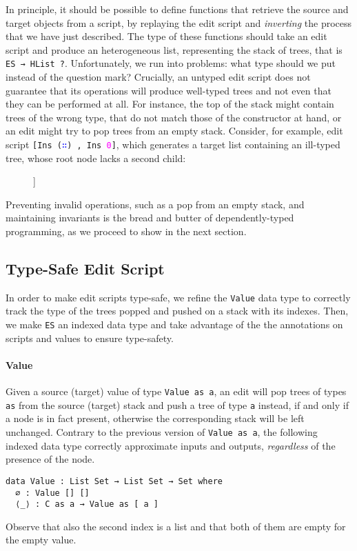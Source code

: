 \documentclass{sigplanconf}
\theoremstyle{plain}
\newcommand{\cons}{\texttt{(\textcolor{blue}{∷})}}
\newcommand{\num}[1]{\textcolor{magenta}{\texttt{#1}}}
\begin{document}
%
In principle, it should be possible to define functions that retrieve
the source and target objects from a script, by replaying the edit
script and \emph{inverting} the process that we have just described.
%
The type of these functions should take an edit script and produce an
heterogeneous list, representing the stack of trees, that is \texttt{ES →
  HList ?}.
%
Unfortunately, we run into problems: what type should we put instead of
the question mark?
%
Crucially, an untyped edit script does not guarantee that its
operations will produce well-typed trees and not even that they can be
performed at all.
%
For instance, the top of the stack might contain trees of the wrong
type, that do not match those of the constructor at hand, or an edit
might try to pop trees from an empty stack.
%
Consider, for example, edit script \texttt{[Ins \cons
  , Ins \num{0}]}, which generates a target list
containing an ill-typed tree, whose root node lacks a second child:
\begin{figure}[!h]
\centering
\Tree
[.{\cons}
   [.{\num{0}} ]
]
\end{figure}

%
Preventing invalid operations, such as a pop from an empty stack, and
maintaining invariants is the bread and butter of dependently-typed
programming, as we proceed to show in the next section.

\subsection{Type-Safe Edit Script}
In order to make edit scripts type-safe, we refine the \texttt{Value}
data type to correctly track the type of the trees popped and pushed
on a stack with its indexes.
%
Then, we make \texttt{ES} an indexed data type and take advantage of
the the annotations on scripts and values to ensure type-safety.

\paragraph{Value}
Given a source (target) value of type \texttt{Value as a}, an edit
will pop trees of types \texttt{as} from the source (target) stack and
push a tree of type \texttt{a} instead, if and only if a node is in
fact present, otherwise the corresponding stack will be left
unchanged.
%
Contrary to the previous version of \texttt{Value as a}, the following
indexed data type correctly approximate inputs and outputs,
\emph{regardless} of the presence of the node.
\begin{verbatim}
data Value : List Set → List Set → Set where
  ∅ : Value [] []
  ⟨_⟩ : C as a → Value as [ a ] 
\end{verbatim}
Observe that also the second index is a list and that both of them are
empty for the empty value.
%
\end{document}
